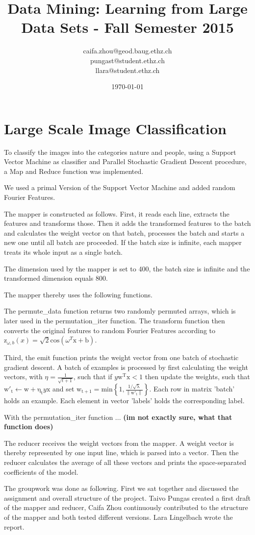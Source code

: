 \documentclass[a4paper, 11pt]{article}
\title{Data Mining: Learning from Large Data Sets - Fall Semester 2015}
\author{caifa.zhou@geod.baug.ethz.ch\\ pungast@student.ethz.ch\\ llara@student.ethz.ch\\}
\date{\today}
\begin{document}
\maketitle

\section*{Large Scale Image Classification} 
To classify the images into the categories nature and people, using a Support Vector Machine as classifier and Parallel Stochastic Gradient Descent procedure, a Map and Reduce function was implemented. 

We used a primal  Version of the Support Vector Machine and added random Fourier Features.

The mapper is constructed as follows. First, it reads each line, extracts the features and transforms those. Then it adds the transformed features to the batch and calculates the weight vector on that batch, processes the batch and starts a new one until all batch are proceeded. If the batch size is infinite, each mapper treats its whole input as a single batch.

The dimension used by the mapper is set to 400, the batch size is infinite and the transformed dimension equals 800. 

The mapper thereby uses the following functions. 

The permute\_data function returns two randomly permuted arrays, which is later used in the permutation\_iter function. The transform function then converts the original features to random Fourier Features according to $\mathrm{z}_{\omega, b}\left ( x \right ) = \mathrm{\sqrt{2}} {\mathrm{cos}\left ( \omega ^{T}\mathrm{x + b} \right )}$.

Third, the emit function prints the weight vector from one batch of stochastic gradient descent. A batch of examples is processed by first calculating the weight vectors, with $\eta = \frac{1}{\sqrt{t +1}}$, such that if $y\mathrm{w^{T}x} < 1$ then update the weights, such that $\mathrm{w'_{t}} \leftarrow\mathrm{w + \eta _{t}}y \mathrm{x}$ and set $\mathrm{w_{t+1}} = \mathrm{min \left \{1,\frac{1/\sqrt{\lambda }}{\left \| w'_{t} \right \|} \right \}}$. Each row in matrix 'batch' holds an example. Each element in vector 'labels' holds the corresponding label.

With the permutation\_iter function  ... \textbf{(im not exactly sure, what that function does)}

The reducer receives the weight vectors from the mapper. A weight vector is thereby represented by one input line, which is parsed into a vector. Then the reducer calculates the average of all these vectors and prints the space-separated coefficients of the model.

The groupwork was done as following. First we sat together and discussed the assignment and overall structure of the project. Taivo Pungas created a first draft of the mapper and reducer, Caifa Zhou continuously contributed to the structure of the mapper and both tested different versions. Lara Lingelbach wrote the report. 
\end{document}
